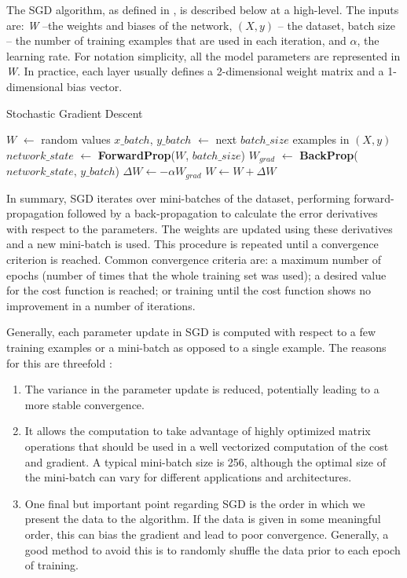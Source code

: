 The SGD algorithm, as defined in \cite{duda2012pattern}, is described below at a high-level. The inputs
are: \textit{W} --the weights and biases of the network, $(X, y)$ -- the dataset, batch size -- the number of training examples that are used in each iteration, and $\alpha$, the learning rate. For notation simplicity, all the model parameters are represented in \textit{W}. In practice, each
layer usually defines a 2-dimensional weight matrix and a 1-dimensional bias vector.

\begin{algorithm}
\caption{Stochastic Gradient Descent}\label{euclid}
\begin{algorithmic}
\State	$W$ $\longleftarrow$ random values
\Repeat
\State $x\_batch$, $y\_batch$ $\longleftarrow$ next $batch\_size$ examples in $(X, y)$
\State $network\_state$ $\longleftarrow$ \textbf{ForwardProp}($W$, $batch\_size$)
\State $W_{grad}$ $\longleftarrow$ \textbf{BackProp}($network\_state$, $y\_batch$)
\State $\Delta W \longleftarrow -\alpha W_{grad} $
\State $W \longleftarrow W + \Delta W$
\end{algorithmic}
\end{algorithm}

In summary, SGD iterates over mini-batches of the dataset, performing forward-propagation followed by a back-propagation to calculate the error derivatives with respect to the parameters. The weights are updated using these derivatives and a new mini-batch is used. This procedure is repeated until a convergence criterion is reached. Common convergence criteria are: a maximum number of epochs (number of times that the whole training set was used); a desired value for the cost function is reached; or training until the cost function shows no improvement in a number of iterations.

Generally, each parameter update in SGD is computed with respect to a few training examples or a mini-batch as opposed to a single example. The reasons for this are threefold \cite{sgd}:
\begin{enumerate}
	\item The variance in the parameter update is reduced, potentially leading to a more stable convergence. 
	\item It allows the computation to take advantage of highly optimized matrix operations that should be used in a well vectorized computation of the cost and gradient.  A typical mini-batch size is 256, although the optimal size of the mini-batch can vary for different applications and architectures.
	\item One final but important point regarding SGD is the order in which we present the data to the algorithm. If the data is given in some meaningful order, this can bias the gradient and lead to poor convergence. Generally, a good method to avoid this is to randomly shuffle the data prior to each epoch of training.
\end{enumerate}


